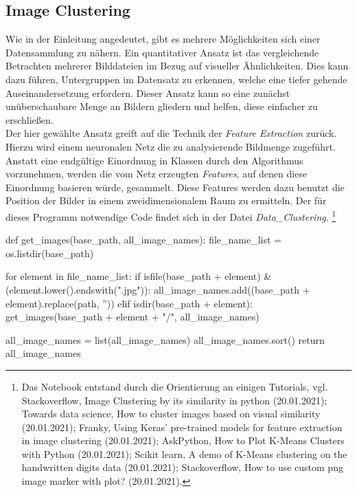 \documentclass[a4paper,12pt,ngerman]{article}
\begin{document}
\subsection{Image Clustering}

Wie in der Einleitung angedeutet, gibt es mehrere Möglichkeiten sich einer Datensammlung zu nähern. Ein quantitativer Ansatz ist das vergleichende Betrachten mehrerer Bilddateien im Bezug auf visueller Ähnlichkeiten. Dies kann dazu führen, Untergruppen im Datensatz zu erkennen, welche eine tiefer gehende Auseinandersetzung erfordern. Dieser Ansatz kann so eine zunächst unüberschaubare Menge an Bildern gliedern und helfen, diese einfacher zu erschließen. \\
Der hier gewählte Ansatz greift auf die Technik der \textit{Feature Extraction} zurück. Hierzu wird einem neuronalen Netz die zu analysierende Bildmenge zugeführt. Anstatt eine endgültige Einordnung in Klassen durch den Algorithmus vorzunehmen, werden die vom Netz erzeugten \textit{Features}, auf denen diese Einordnung basieren würde, gesammelt. Diese Features werden dazu benutzt die Position der Bilder in einem zweidimensionalem Raum zu ermitteln. Der für dieses Programm notwendige Code findet sich in der Datei \textit{Data\_Clustering}. \footnote{Das Notebook entstand durch die Orientierung an einigen Tutorials, vgl. Stackoverflow, Image Clustering by its similarity in python (20.01.2021); Towards data science, How to cluster images based on visual similarity (20.01.2021); Franky, Using Keras' pre-trained models for feature extraction in image clustering (20.01.2021); AskPython, How to Plot K-Means Clusters with Python (20.01.2021); Scikit learn, A demo of K-Means clustering on the handwritten digits data (20.01.2021); Stackoverflow, How to use custom png image marker with plot? (20.01.2021).} \\

\begin{python}
	def get_images(base_path, all_image_names):
    file_name_list = os.listdir(base_path)
    
    for element in file_name_list:
        if isfile(base_path + element) & (element.lower().endswith(".jpg")):
            all_image_names.add((base_path + element).replace(path, ''))
        elif isdir(base_path + element):
            get_images(base_path + element + "/", all_image_names)

    all_image_names = list(all_image_names)
    all_image_names.sort()
	return all_image_names
\end{python}
\end{document}
